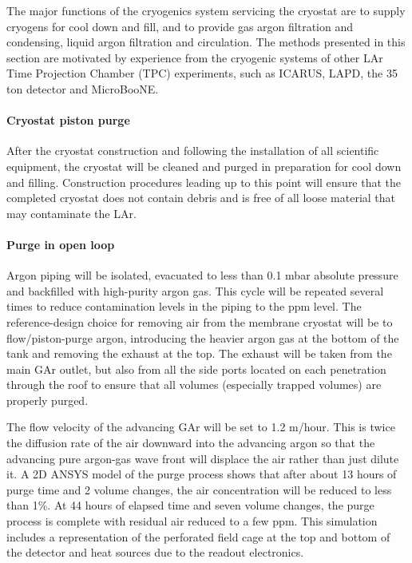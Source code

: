 The major functions of the cryogenics system servicing the cryostat are to supply cryogens for cool down and fill, and to provide gas argon filtration and condensing, liquid argon filtration and circulation. The methods presented in this section are motivated by experience from the cryogenic systems of other LAr Time Projection Chamber (TPC) experiments, such as ICARUS, LAPD, the 35 ton detector and MicroBooNE.

\paragraph{Cryostat piston purge}
%
After the cryostat construction and following the installation of all scientific equipment, the cryostat will be cleaned and purged in preparation for cool down and filling. Construction procedures leading up to this point will ensure that the completed cryostat does not contain debris and is free of all loose material that may contaminate the LAr.

\paragraph{Purge in open loop}
%
Argon piping will be isolated, evacuated to less than 0.1 mbar  absolute pressure and backfilled with high-purity argon gas. This cycle will be repeated several times to reduce contamination levels in the piping to the ppm level. The reference-design choice for removing air from the membrane cryostat will be to flow/piston-purge argon, introducing the heavier argon gas at the bottom of the tank and removing the exhaust at the top. The exhaust will be taken from the main GAr outlet, but also from all the side ports located on each penetration through the roof to ensure that all volumes (especially trapped volumes) are properly purged.

The flow velocity of the advancing GAr will be set to 1.2 m/hour. This is twice the diffusion rate of the air downward into the advancing argon so that the advancing pure argon-gas wave front will displace the air rather than just dilute it. A 2D ANSYS model of the purge process shows that after about 13 hours of purge time and 2 volume changes, the air concentration will be reduced to less than 1\%. At 44 hours of elapsed time and seven volume changes, the purge process is complete with residual air reduced to a few ppm. This simulation includes a representation of the perforated field cage at the top and bottom of the detector and heat sources due to the readout electronics. %

